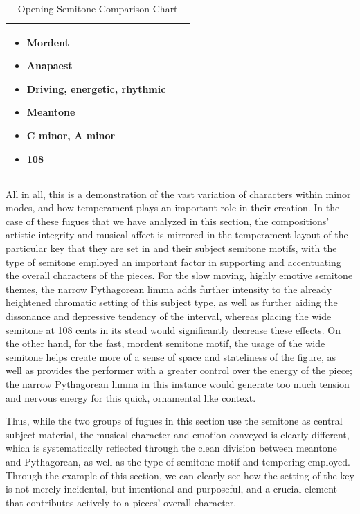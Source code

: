 \begin{table}[H]
\begin{singlespace}
\begin{tabularx}{5.5in}{|>{\RaggedRight}X|>{\RaggedRight}X|>{\RaggedRight}X|}
\vspace{-1em}
\begin{itemize}[leftmargin=*]
\item Mordent
\item Anapaest \newline ~
\item Driving, energetic, \newline rhythmic
\item Meantone
\item C minor, A minor
\item 108
\end{itemize}

\\

\hline
\end{tabularx}
\small
\end{singlespace}
\caption{Opening Semitone Comparison Chart}
\end{table}
    All in all, this is a demonstration of the vast variation of characters
within minor modes, and how temperament plays an important role in their
creation. In the case of these fugues that we have analyzed in this
section, the compositions' artistic integrity and musical affect is
mirrored in the temperament layout of the particular key that they are
set in and their subject semitone motifs, with the type of semitone
employed an important factor in supporting and accentuating the overall
characters of the pieces. For the slow moving, highly emotive semitone
themes, the narrow Pythagorean limma adds further intensity to the
already heightened chromatic setting of this subject type, as well as
further aiding the dissonance and depressive tendency of the interval,
whereas placing the wide semitone at 108 cents in its stead would
significantly decrease these effects. On the other hand, for the fast,
mordent semitone motif, the usage of the wide semitone helps create more
of a sense of space and stateliness of the figure, as well as provides
the performer with a greater control over the energy of the piece; the
narrow Pythagorean limma in this instance would generate too much
tension and nervous energy for this quick, ornamental like context.

Thus, while the two groups of fugues in this section use the semitone as
central subject material, the musical character and emotion conveyed is
clearly different, which is systematically reflected through the clean
division between meantone and Pythagorean, as well as the type of
semitone motif and tempering employed. Through the example of this
section, we can clearly see how the setting of the key is not merely
incidental, but intentional and purposeful, and a crucial element that
contributes actively to a pieces' overall character.

